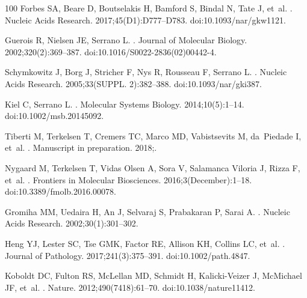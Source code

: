 \documentclass[10pt,letterpaper]{article}
\begin{document}
\begin{thebibliography}{100}
Forbes SA, Beare D, Boutselakis H, Bamford S, Bindal N, Tate J, et~al.
.
\newblock Nucleic Acids Research. 2017;45(D1):D777--D783.
\newblock doi:{10.1093/nar/gkw1121}.

Guerois R, Nielsen JE, Serrano L.
.
\newblock Journal of Molecular Biology. 2002;320(2):369--387.
\newblock doi:{10.1016/S0022-2836(02)00442-4}.

Schymkowitz J, Borg J, Stricher F, Nys R, Rousseau F, Serrano L.
.
\newblock Nucleic Acids Research. 2005;33(SUPPL. 2):382--388.
\newblock doi:{10.1093/nar/gki387}.

Kiel C, Serrano L.
.
\newblock Molecular Systems Biology. 2014;10(5):1--14.
\newblock doi:{10.1002/msb.20145092}.

Tiberti M, Terkelsen T, Cremers TC, Marco MD, Vabistsevits M, da~Piedade I,
  et~al.
.
\newblock Manuscript in preparation. 2018;.

Nygaard M, Terkelsen T, {Vidas Olsen} A, Sora V, {Salamanca Viloria} J, Rizza
  F, et~al.
.
\newblock Frontiers in Molecular Biosciences. 2016;3(December):1--18.
\newblock doi:{10.3389/fmolb.2016.00078}.

Gromiha MM, Uedaira H, An J, Selvaraj S, Prabakaran P, Sarai A.
.
\newblock Nucleic Acids Research. 2002;30(1):301--302.

Heng YJ, Lester SC, Tse GMK, Factor RE, Allison KH, Collins LC, et~al.
.
\newblock Journal of Pathology. 2017;241(3):375--391.
\newblock doi:{10.1002/path.4847}.

Koboldt DC, Fulton RS, McLellan MD, Schmidt H, Kalicki-Veizer J, McMichael JF,
  et~al.
.
\newblock Nature. 2012;490(7418):61--70.
\newblock doi:{10.1038/nature11412}.


\end{thebibliography}
\end{document}
